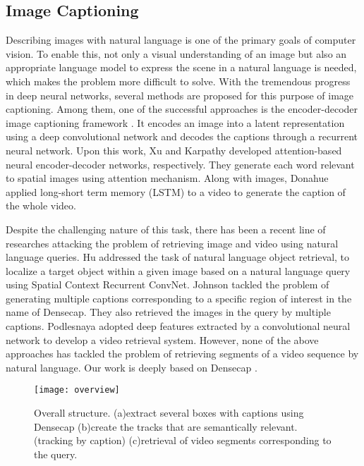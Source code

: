 \subsection{Image Captioning} 

Describing images with natural language is one of the primary goals of computer vision. 
To enable this, not only a visual understanding of an image but also an appropriate language model to express the scene in a natural language is needed, which makes the problem more difficult to solve. 
With the tremendous progress in deep neural networks, several methods are proposed for this purpose of image captioning. Among them, one of the successful approaches is the encoder-decoder image captioning framework \cite{vinyals2015show}. 
It encodes an image into a latent representation using a deep convolutional network and decodes the captions through a recurrent neural network. Upon this work, Xu \etal \cite{xu2015show} and Karpathy \etal \cite{karpathy2015deep} developed attention-based neural encoder-decoder networks, respectively. 
They generate each word relevant to spatial images using attention mechanism. 
Along with images, Donahue \etal \cite{donahue2015long} applied long-short term memory (LSTM) to a video to generate the caption of the whole video.

Despite the challenging nature of this task, there has been a recent line of researches attacking the problem of retrieving image and video using natural language queries. Hu \etal \cite{hu2016natural} addressed the task of natural language object retrieval, to localize a target object within a given image based on a natural language query using Spatial Context Recurrent ConvNet. 
Johnson \etal \cite{johnson2016densecap} tackled the problem of generating multiple captions corresponding to a specific region of interest in the name of Densecap. 
They also retrieved the images in the query by multiple captions. 
Podlesnaya \etal  \cite{podlesnaya2016deep} adopted deep features extracted by a convolutional neural network to develop a video retrieval system. 
However, none of the above approaches has tackled the problem of retrieving segments of a video sequence by natural language. 
Our work is deeply based on Densecap \cite{johnson2016densecap}.



\begin{figure*}[th]
\texttt{[image: overview]}
\caption{Overall structure. (a)extract several boxes with captions using Densecap \cite{johnson2016densecap}  (b)create the tracks that are semantically relevant. (tracking by caption) (c)retrieval of video segments corresponding to the query.}
\label{fig:overview}
\end{figure*}



